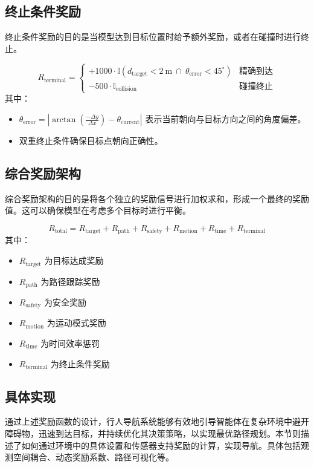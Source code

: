 \subsection{终止条件奖励}
终止条件奖励的目的是当模型达到目标位置时给予额外奖励，或者在碰撞时进行终止。

\begin{equation}
R_{\text{terminal}} =
\begin{cases}
+1000 \cdot \mathbb{I}(d_{\text{target}} < 2\ \text{m}\ \cap\ \theta_{\text{error}} < 45^\circ) & \text{精确到达} \\
-500 \cdot \mathbb{I}_{\text{collision}} & \text{碰撞终止}
\end{cases}
\end{equation}
其中：
\begin{itemize}
    \item \( \theta_{\text{error}} = \left| \arctan\left(\frac{-\Delta y}{\Delta x}\right) - \theta_{\text{current}} \right| \) 表示当前朝向与目标方向之间的角度偏差。
    \item 双重终止条件确保目标点朝向正确性。
\end{itemize}

\subsection{综合奖励架构}
综合奖励架构的目的是将各个独立的奖励信号进行加权求和，形成一个最终的奖励值。这可以确保模型在考虑多个目标时进行平衡。

\begin{equation}
R_{\text{total}} = R_{\text{target}} + R_{\text{path}} + R_{\text{safety}} + R_{\text{motion}} + R_{\text{time}} + R_{\text{terminal}}
\end{equation}
其中：
\begin{itemize}
    \item \( R_{\text{target}} \) 为目标达成奖励
    \item \( R_{\text{path}} \) 为路径跟踪奖励
    \item \( R_{\text{safety}} \) 为安全奖励
    \item \( R_{\text{motion}} \) 为运动模式奖励
    \item \( R_{\text{time}} \) 为时间效率惩罚
    \item \( R_{\text{terminal}} \) 为终止条件奖励
\end{itemize}

\subsection{具体实现}
通过上述奖励函数的设计，行人导航系统能够有效地引导智能体在复杂环境中避开障碍物，迅速到达目标，并持续优化其决策策略，以实现最优路径规划。本节则描述了如何通过环境中的具体设置和传感器支持奖励的计算，实现导航。具体包括观测空间耦合、动态奖励系数、路径可视化等。

